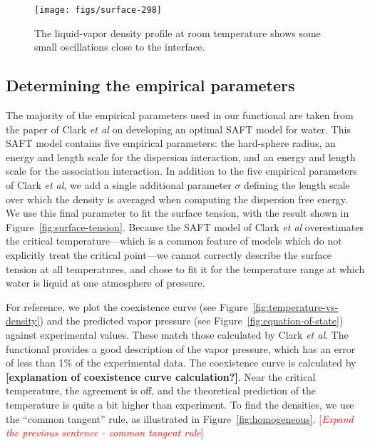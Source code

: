 \documentclass[letterpaper,twocolumn,amsmath,amssymb,prb]{revtex4-1}
\newcommand{\red}[1]{{\bf \color{red} #1}}
\newcommand{\fixme}[1]{\red{[#1]}}
\newcommand{\needsworknow}[1]{\textcolor{red}{[\emph{#1}]}}
\begin{document}
\begin{figure}
\begin{center}
\texttt{[image: figs/surface-298]}
\end{center}
\caption{The liquid-vapor density profile at room temperature shows
some small oscillations close to the interface.  }
\label{fig:liquid-vapor-profile}
\end{figure}

\subsection{Determining the empirical parameters}\label{sec:empirical}

The majority of the empirical parameters used in our functional are
taken from the paper of Clark \emph{et al} on developing an optimal
SAFT model for water\cite{clark2006developing}.  This SAFT model
contains five empirical parameters: the hard-sphere radius, an energy
and length scale for the dispersion interaction, and an energy and
length scale for the association interaction.  In addition to the five
empirical parameters of Clark \emph{et al}, we add a single additional
parameter $\sigma$ defining the length scale over which the density is averaged
when computing the dispersion free energy.  We use this final
parameter to fit the surface tension, with the result shown in
Figure~\ref{fig:surface-tension}.  Because the SAFT model of Clark
\emph{et al} overestimates the critical temperature---which is a
common feature of models which do not explicitly treat the critical
point---we cannot correctly describe the surface tension at all
temperatures, and chose to fit it for the temperature range at which
water is liquid at one atmosphere of pressure.

For reference, we plot the coexistence curve (see
Figure~\ref{fig:temperature-vs-density}) and the predicted vapor pressure (see
Figure~\ref{fig:equation-of-state}) against experimental values.  These
match those calculated by Clark \emph{et al}. The functional provides a good description of
the vapor pressure, which has an error of less than 
1\% of the experimental data. The coexistence curve is calculated by 
\fixme{explanation of coexistence curve calculation?}. Near the critical temperature,
the agreement is off, and the theoretical prediction  of the temperature is quite a bit higher than
experiment. To find the densities, we use the
``common tangent'' rule, as illustrated in Figure~\ref{fig:homogeneous}.
\needsworknow{Expand the previous sentence - common tangent rule}
\end{document}
